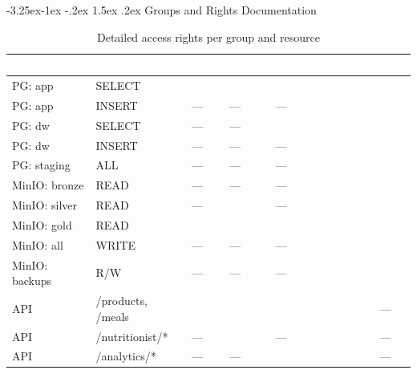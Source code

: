 \documentclass[a4paper,11pt,oneside,openany]{report}
\makeatletter
\renewcommand\subsection{\@startsection{subsection}{2}{\z@}%
  {-3.25ex\@plus -1ex \@minus -.2ex}%
  {1.5ex \@plus .2ex}%
  {\normalfont\large\bfseries\color{ntdarkgreen}}}
\makeatother
\begin{document}
\subsection{Groups and Rights Documentation}

\newcommand{\cmark}{\textcolor{ntgreen}{\faCheckCircle}}
\newcommand{\xmark}{\textcolor{ntgray!40}{---}}

\begin{table}[H]
\centering
\caption{Detailed access rights per group and resource}
\label{tab:detailed-rights}
\small
{}
\begin{tabularx}{\textwidth}{L{2cm} L{2.2cm} C{1cm} C{1cm} C{1cm} C{1cm} C{1cm}}
\toprule
{}
\textcolor{white}{\textbf{Resource}} & \textcolor{white}{\textbf{Permission}} & \textcolor{white}{\textbf{User}} & \textcolor{white}{\textbf{Nutri.}} & \textcolor{white}{\textbf{Analyst}} & \textcolor{white}{\textbf{Admin}} & \textcolor{white}{\textbf{ETL}} \\
\midrule
{}
PG: app & SELECT & \cmark & \cmark & \cmark & \cmark & \cmark \\
PG: app & INSERT & \xmark & \xmark & \xmark & \cmark & \cmark \\
PG: dw & SELECT & \xmark & \xmark & \cmark & \cmark & \cmark \\
PG: dw & INSERT & \xmark & \xmark & \xmark & \cmark & \cmark \\
PG: staging & ALL & \xmark & \xmark & \xmark & \cmark & \cmark \\
\midrule
{}
MinIO: bronze & READ & \xmark & \xmark & \xmark & \cmark & \cmark \\
MinIO: silver & READ & \xmark & \cmark & \xmark & \cmark & \cmark \\
MinIO: gold & READ & \cmark & \cmark & \cmark & \cmark & \cmark \\
MinIO: all & WRITE & \xmark & \xmark & \xmark & \cmark & \cmark \\
MinIO: backups & R/W & \xmark & \xmark & \xmark & \cmark & \cmark \\
\midrule
{}
API & /products, /meals & \cmark & \cmark & \cmark & \cmark & \xmark \\
API & /nutritionist/* & \xmark & \cmark & \xmark & \cmark & \xmark \\
API & /analytics/* & \xmark & \xmark & \cmark & \cmark & \xmark \\

\end{tabularx}
\end{table}
\end{document}
